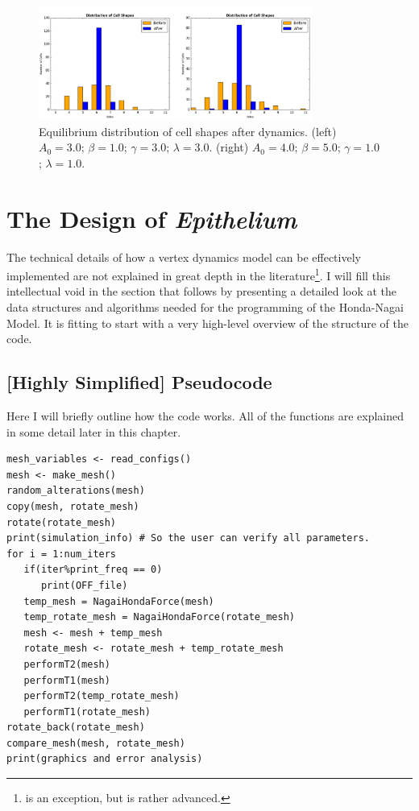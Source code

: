 \begin{figure}
\centering
\includegraphics[width=0.8\textwidth]{../diagrams/shapeComp.png}
\caption[Equilibrium distribution of cell shapes.]{Equilibrium distribution of cell shapes after dynamics. (left) $A_0 = 3.0$; $\beta = 1.0$; $\gamma = 3.0$; $\lambda = 3.0$. (right) $A_0 = 4.0$; $\beta = 5.0$; $\gamma = 1.0$; $\lambda = 1.0$.}
\label{fig:g4}
\end{figure}

\section{The Design of \emph{Epithelium}}
The technical details of how a vertex dynamics model can be effectively implemented are not explained in great depth in the literature\footnote{\cite{ChasteMain} is an exception, but is rather advanced.}. I will fill this intellectual void in the section that follows by presenting a detailed look at the data structures and algorithms needed for the programming of the Honda-Nagai Model. It is fitting to start with a very high-level overview of the structure of the code.

\subsection{[Highly Simplified] Pseudocode}
Here I will briefly outline how the code works. All of the functions are explained in some detail later in this chapter.
\begin{lstlisting}
mesh_variables <- read_configs()
mesh <- make_mesh()
random_alterations(mesh)
copy(mesh, rotate_mesh)
rotate(rotate_mesh)
print(simulation_info) # So the user can verify all parameters.
for i = 1:num_iters
   if(iter%print_freq == 0)
      print(OFF_file)
   temp_mesh = NagaiHondaForce(mesh) 
   temp_rotate_mesh = NagaiHondaForce(rotate_mesh)
   mesh <- mesh + temp_mesh
   rotate_mesh <- rotate_mesh + temp_rotate_mesh
   performT2(mesh)
   performT1(mesh)
   performT2(temp_rotate_mesh)
   performT1(rotate_mesh)
rotate_back(rotate_mesh)
compare_mesh(mesh, rotate_mesh)
print(graphics and error analysis)
\end{lstlisting}

